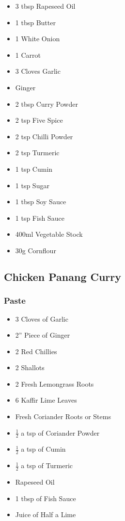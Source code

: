 \documentclass[11pt, english]{article}
\begin{document}
	\begin{itemize}
        \setlength\itemsep{0cm}
                \item 3 tbsp Rapeseed Oil
		\item 1 tbsp Butter
		\item 1 White Onion
		\item 1 Carrot
		\item 3 Cloves Garlic
		\item Ginger
		\item 2 tbsp Curry Powder
		\item 2 tsp Five Spice
		\item 2 tsp Chilli Powder
		\item 2 tsp Turmeric
		\item 1 tsp Cumin
		\item 1 tsp Sugar
		\item 1 tbsp Soy Sauce
		\item 1 tsp Fish Sauce
		\item 400ml Vegetable Stock
		\item 30g Cornflour
        \end{itemize}

\newpage

	\subsection{Chicken Panang Curry}

                \subsubsection*{Paste}

        \begin{itemize}
        \setlength\itemsep{0cm}
                \item 3 Cloves of Garlic
                \item 2'' Piece of Ginger
                \item 2 Red Chillies
                \item 2 Shallots
                \item 2 Fresh Lemongrass Roots
		\item 6 Kaffir Lime Leaves
                \item Fresh Coriander Roots or Stems
		\item $\frac{1}{2}$ a tsp of Coriander Powder
                \item $\frac{1}{2}$ a tsp of Cumin
		\item $\frac{1}{2}$ a tsp of Turmeric
		\item Rapeseed Oil
                \item 1 tbsp of Fish Sauce
                \item Juice of Half a Lime
        \end{itemize}
\end{document}
